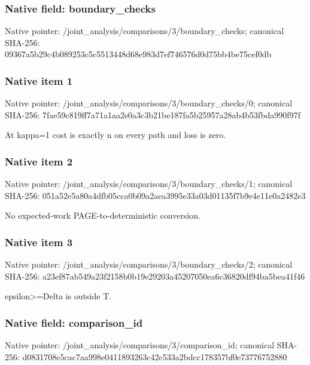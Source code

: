 \documentclass[10pt,a4paper]{article}
\begin{document}
\subsubsection{Native field: boundary\_\allowbreak{}checks}
Native pointer: /joint\_\allowbreak{}analysis/comparisons/3/boundary\_\allowbreak{}checks; canonical SHA-256: 09367a5b29c4b089253c5c5513448d68e983d7ef746576d0d75bb4be75cef0db

\subsubsection{Native item 1}
Native pointer: /joint\_\allowbreak{}analysis/comparisons/3/boundary\_\allowbreak{}checks/0; canonical SHA-256: 7fae59c819ff7a71a1aa2e0a3c3b21be187fa5b25957a28ab4b53fbda990f97f

\begingroup\raggedright\sloppy At kappa=\allowbreak{}1 cost is exactly n on every path and loss is zero.\par\endgroup

\subsubsection{Native item 2}
Native pointer: /joint\_\allowbreak{}analysis/comparisons/3/boundary\_\allowbreak{}checks/1; canonical SHA-256: 051a52e5a80a4dfb05cca0b09a2aea3995e33a03d01135f7b9e4e11e0a2482e3

\begingroup\raggedright\sloppy No expected-work PAGE-to-deterministic conversion.\par\endgroup

\subsubsection{Native item 3}
Native pointer: /joint\_\allowbreak{}analysis/comparisons/3/boundary\_\allowbreak{}checks/2; canonical SHA-256: a23ef87ab549a23f2158b0b19e29203a45207050ea6c36820df94ba5bea41f46

\begingroup\raggedright\sloppy epsilon>=\allowbreak{}Delta is outside T.\par\endgroup

\subsubsection{Native field: comparison\_\allowbreak{}id}
Native pointer: /joint\_\allowbreak{}analysis/comparisons/3/comparison\_\allowbreak{}id; canonical SHA-256: d0831708e5cac7aa998e0411893263c42c533a2bdcc178357bf0e73776752880
\end{document}
